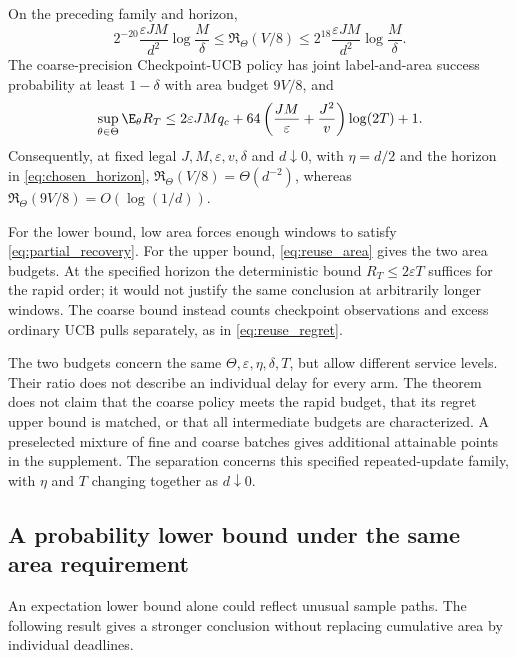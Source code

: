 \begin{theorem}
\label{thm:tradeoff}
On the preceding family and horizon,
\begin{equation}
 2^{-20}\frac{\varepsilon JM}{d^2}\log\frac M\delta
 \le\mathfrak R_\Theta(V/8)\le
 2^{18}\frac{\varepsilon JM}{d^2}\log\frac M\delta.
 \label{eq:rapid_matched}
\end{equation}
The coarse-precision Checkpoint-UCB policy has joint label-and-area success
probability at least $1-\delta$ with area budget $9V/8$, and
\begin{equation}
 \sup_{\theta\in\Theta}\E_\theta R_T\le
 2\varepsilon JM q_c+
 64\left(\frac{JM}{\varepsilon}+\frac{J^2}{v}\right)\log(2T)+1.
 \label{eq:coarse_regret}
\end{equation}
Consequently, at fixed legal $J,M,\varepsilon,v,\delta$ and $d\downarrow0$,
with $\eta=d/2$ and the horizon in \eqref{eq:chosen_horizon},
$\mathfrak R_\Theta(V/8)=\Theta(d^{-2})$, whereas
$\mathfrak R_\Theta(9V/8)=O(\log(1/d))$.
\end{theorem}

For the lower bound, low area forces enough windows to satisfy
\eqref{eq:partial_recovery}. For the upper bound, \eqref{eq:reuse_area}
gives the two area budgets. At the specified horizon the deterministic bound
$R_T\le2\varepsilon T$ suffices for the rapid order; it would not justify
the same conclusion at arbitrarily longer windows. The coarse bound instead
counts checkpoint observations and excess ordinary UCB pulls separately,
as in \eqref{eq:reuse_regret}.

The two budgets concern the same $\Theta,\varepsilon,\eta,\delta,T$, but
allow different service levels. Their ratio does not describe an individual
delay for every arm. The theorem does not claim that the coarse policy meets
the rapid budget, that its regret upper bound is matched, or that all
intermediate budgets are characterized. A preselected mixture of fine and
coarse batches gives additional attainable points in the supplement. The
separation concerns this specified repeated-update family, with $\eta$ and
$T$ changing together as $d\downarrow0$.

\subsection{A probability lower bound under the same area requirement}

An expectation lower bound alone could reflect unusual sample paths. The
following result gives a stronger conclusion without replacing cumulative
area by individual deadlines.

